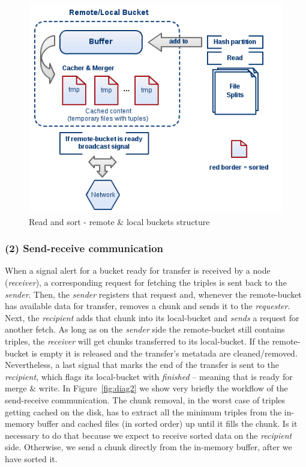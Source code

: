 \begin{figure}
\centering
\includegraphics[scale=0.6]{diag1}
\caption{Read and sort - remote \& local buckets structure}
\label{fig:diag1}
\end{figure}

% 
\subsubsection*{(2) Send-receive communication}

When a signal alert for a bucket ready for transfer is received by a node (\textit{receiver}), a corresponding request for fetching the triples is sent back to the \textit{sender}. Then, the \textit{sender} registers that request and, whenever the remote-bucket has available data for transfer, removes a chunk and sends it to the \textit{requester}. Next, the \textit{recipient} adds that chunk into its local-bucket and \textit{sends} a request for another fetch. As long as on the \textit{sender} side the remote-bucket still contains triples, the \textit{receiver} will get chunks transferred to its local-bucket. If the remote-bucket is empty it is released and the transfer's metatada are cleaned/removed. Nevertheless, a last signal that marks the end of the transfer is sent to the \textit{recipient}, which flags its local-bucket with \textit{finished} -- meaning that is ready for merge \& write. In Figure~\ref{fig:diag2} we show very briefly the workflow of the send-receive communication. The chunk removal, in the worst case of triples getting cached on the disk, has to extract all the minimum triples from the in-memory buffer and cached files (in sorted order) up until it fills the chunk. Is it necessary to do that because we expect to receive sorted data on the \textit{recipient} side. Otherwise,  we send a chunk directly from the in-memory buffer, after we have sorted it.

